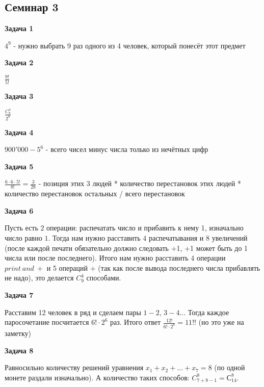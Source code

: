 \subsection{Семинар 3}
\begin{center}
\textbf{Задача 1}
\end{center}
$\displaystyle 4^{9}$ - нужно выбрать 9 раз одного из 4 человек, который понесёт этот предмет 

\begin{center}
\textbf{Задача 2}
\end{center}
$\displaystyle \frac{9!}{5!}$

\begin{center}
\textbf{Задача 3}
\end{center}
$\displaystyle \frac{C_{8}^{4}}{2^{8}}$

\begin{center}
\textbf{Задача 4}
\end{center}
$\displaystyle 900'000-5^{6}$ - всего чисел минус числа только из нечётных цифр

\begin{center}
\textbf{Задача 5}
\end{center}
$\displaystyle \frac{6\cdotp 6\cdotp 5!}{8!} =\frac{3}{28}$ - позиция этих 3 людей * количество перестановок этих людей * количество перестановок остальных / всего перестановок

\begin{center}
\textbf{Задача 6}
\end{center}
Пусть есть $\displaystyle 2$ операции: распечатать число и прибавить к нему 1, изначально число равно $\displaystyle 1$. Тогда нам нужно расставить $\displaystyle 4$ распечатывания и $\displaystyle 8$ увеличений (после каждой печати обязательно должно следовать +1, +1 может быть до 1 числа или после последнего). Итого нам нужно расставить $\displaystyle 4$ операции $\displaystyle print\ and\ +$ и 5 операций $\displaystyle +$ (так как после вывода последнего числа прибавлять не надо), это делается $\displaystyle C_{9}^{4}$ способами.

\begin{center}
\textbf{Задача 7}
\end{center}
Расставим 12 человек в ряд и сделаем пары $\displaystyle 1-2$, $\displaystyle 3-4$... Тогда каждое паросочетание посчитается $\displaystyle 6!\cdotp 2^{6}$ раз. Итого ответ $\displaystyle \frac{12!}{6!\cdotp 2^{6}} =11!!$ (но это уже на заметку)

\begin{center}
\textbf{Задача 8}
\end{center}
Равносильно количеству решений уравнения $\displaystyle x_{1} +x_{2} +...+x_{7} =8$ (по одной монете раздали изначально). А количество таких способов: $\displaystyle C_{7+8-1}^{8} =С_{14}^{8}$.

